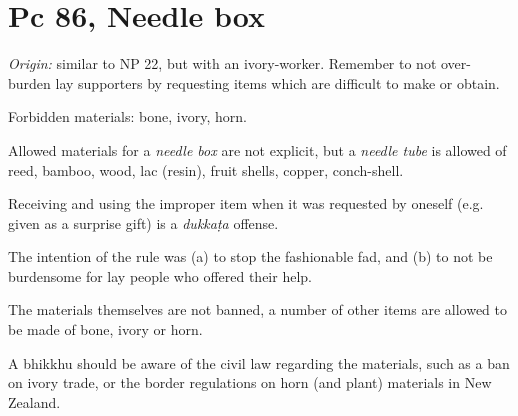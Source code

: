 \section{Pc 86, Needle box}

\emph{Origin:} similar to NP 22, but with an ivory-worker. Remember to
not over-burden lay supporters by requesting items which are difficult
to make or obtain.

Forbidden materials: bone, ivory, horn.

Allowed materials for a \emph{needle box} are not explicit, but a
\emph{needle tube} is allowed of reed, bamboo, wood, lac (resin), fruit
shells, copper, conch-shell.

Receiving and using the improper item when it was requested by oneself
(e.g. given as a surprise gift) is a \emph{dukkaṭa} offense.

The intention of the rule was (a) to stop the fashionable fad, and (b)
to not be burdensome for lay people who offered their help.

The materials themselves are not banned, a number of other items are
allowed to be made of bone, ivory or horn.

A bhikkhu should be aware of the civil law regarding the materials, such
as a ban on ivory trade, or the border regulations on horn (and plant)
materials in New Zealand.

